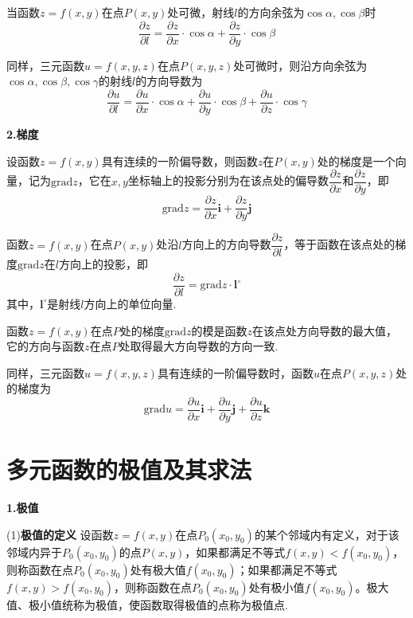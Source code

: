 当函数$z=f(x,y)$在点$P(x,y)$处可微，射线$l$的方向余弦为$\cos\alpha,\cos\beta$时
\begin{equation*}
    \dfrac{\partial z}{\partial l}=\dfrac{\partial z}{\partial x}\cdot\cos\alpha+\dfrac{\partial z}{\partial y}\cdot\cos\beta
\end{equation*}

同样，三元函数$u=f(x,y,z)$在点$P(x,y,z)$处可微时，则沿方向余弦为$\cos\alpha,\cos\beta,\cos\gamma$的射线$l$的方向导数为
\begin{equation*}
    \dfrac{\partial u}{\partial l}=\dfrac{\partial u}{\partial x}\cdot\cos\alpha+\dfrac{\partial u}{\partial y}\cdot\cos\beta+\dfrac{\partial u}{\partial z}\cdot\cos\gamma
\end{equation*}

\textbf{2.梯度}

设函数$z=f(x,y)$具有连续的一阶偏导数，则函数$z$在$P(x,y)$处的梯度是一个向量，记为$\text{grad}z$，它在$x,y$坐标轴上的投影分别为在该点处的偏导数$\dfrac{\partial z}{\partial x}$和$\dfrac{\partial z}{\partial y}$，即
\begin{equation*}
    \text{grad}z=\dfrac{\partial z}{\partial x}\bm{i}+\dfrac{\partial z}{\partial y}\bm{j}
\end{equation*}

函数$z=f(x,y)$在点$P(x,y)$处沿$l$方向上的方向导数$\dfrac{\partial z}{\partial l}$，等于函数在该点处的梯度$\text{grad}z$在$l$方向上的投影，即
\begin{equation*}
    \dfrac{\partial z}{\partial l}=\text{grad}z\cdot\bm{l}^{\circ}
\end{equation*}
其中，$\bm{l}^{\circ}$是射线$l$方向上的单位向量.

函数$z=f(x,y)$在点$P$处的梯度$\text{grad}z$的模是函数$z$在该点处方向导数的最大值，它的方向与函数$z$在点$P$处取得最大方向导数的方向一致.

同样，三元函数$u=f(x,y,z)$具有连续的一阶偏导数时，函数$u$在点$P(x,y,z)$处的梯度为
\begin{equation*}
    \text{grad}u=\dfrac{\partial u}{\partial x}\bm{i}+\dfrac{\partial u}{\partial y}\bm{j}+\dfrac{\partial u}{\partial z}\bm{k}
\end{equation*}

\section{多元函数的极值及其求法}

\textbf{1.极值}

(1)\textbf{极值的定义} \quad 设函数$z=f(x,y)$在点$P_0(x_0,y_0)$的某个邻域内有定义，对于该邻域内异于$P_0(x_0,y_0)$的点$P(x,y)$，如果都满足不等式$f(x,y)<f(x_0,y_0)$，则称函数在点$P_0(x_0,y_0)$处有极大值$f(x_0,y_0)$；如果都满足不等式$f(x,y)>f(x_0,y_0)$，则称函数在点$P_0(x_0,y_0)$处有极小值$f(x_0,y_0)$。极大值、极小值统称为极值，使函数取得极值的点称为极值点.

